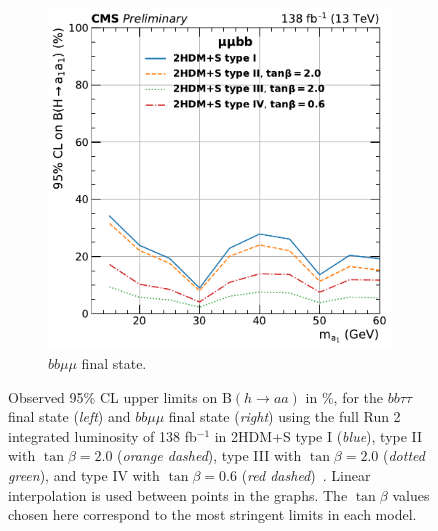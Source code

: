\begin{figure}[ht]
\begin{subfigure}{0.45\textwidth}
    \includegraphics[width=1.0\textwidth]{figures/ch-10-results/HAA_bbmm_all_prelim.pdf}
      \caption{$bb\mu\mu$ final state.}
      \label{fig:bbmumu_only_limits}
  \end{subfigure}
  \caption[Observed 95\% CL upper limits on B$(h \rightarrow aa)$ in \%, for the $bb\tau\tau$ final state (\textit{left}) and $bb\mu\mu$ final state (\textit{right}) using the full Run 2 integrated luminosity of 138 fb$^{-1}$ in 2HDM+S type I (\textit{blue}), type II with $\tan\beta = 2.0$ (\textit{orange dashed}), type III with $\tan\beta = 2.0$ (\textit{dotted green}), and type IV with $\tan\beta = 0.6$ (\textit{red dashed}).]{Observed 95\% CL upper limits on B$(h \rightarrow aa)$ in \%, for the $bb\tau\tau$ final state (\textit{left}) and $bb\mu\mu$ final state (\textit{right}) using the full Run 2 integrated luminosity of 138 fb$^{-1}$ in 2HDM+S type I (\textit{blue}), type II with $\tan\beta = 2.0$ (\textit{orange dashed}), type III with $\tan\beta = 2.0$ (\textit{dotted green}), and type IV with $\tan\beta = 0.6$ (\textit{red dashed})~\cite{CMS-AN-20-213}. Linear interpolation is used between points in the graphs. The $\tan\beta$ values chosen here correspond to the most stringent limits in each model.}
  \label{fig:results_limits_bbtautau_bbmumu_separate}
\end{figure}

